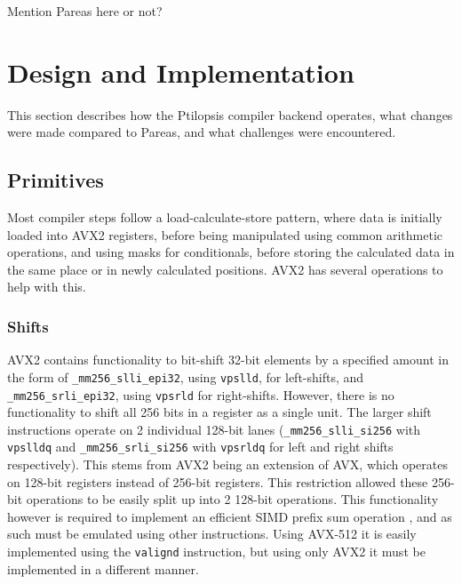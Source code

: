 \documentclass[12pt,dvipsnames]{article}
\newcommand{\helpme}[1]{{\color{red}#1}}
\newcommand{\icpp}[1]{\texttt{#1}}
\newcommand{\mono}[1]{\texttt{#1}}
\begin{document}
\helpme{Mention Pareas here or not?}
\newpage

\section{Design and Implementation}  \label{implementation}

This section describes how the Ptilopsis compiler backend operates, what changes were made compared to Pareas, and what challenges were encountered.

\subsection{Primitives}
Most compiler steps follow a load-calculate-store pattern, where data is initially loaded into AVX2 registers, before being manipulated using common arithmetic operations, and using masks for conditionals, before storing the calculated data in the same place or in newly calculated positions. AVX2 has several operations to help with this.

\subsubsection*{Shifts}
AVX2 contains functionality to bit-shift 32-bit elements by a specified amount in the form of \linebreak \icpp{_mm256_slli_epi32}, using \mono{vpslld}, for left-shifts, and \icpp{_mm256_srli_epi32}, using \mono{vpsrld} for right-shifts. However, there is no functionality to shift all 256 bits in a register as a single unit. The larger shift instructions operate on 2 individual 128-bit lanes (\icpp{_mm256_slli_si256} with \mono{vpslldq} and \icpp{_mm256_srli_si256} with \mono{vpsrldq} for left and right shifts respectively). This stems from AVX2 being an extension of AVX, which operates on 128-bit registers instead of 256-bit registers. This restriction allowed these 256-bit operations to be easily split up into 2 128-bit operations. This functionality however is required to implement an efficient SIMD prefix sum operation \cite{Zhang2020ParallelPS}, and as such must be emulated using other instructions. Using AVX-512 it is easily implemented using the \mono{valignd} instruction, but using only AVX2 it must be implemented in a different manner.
\end{document}
